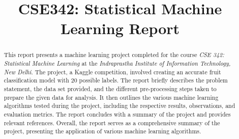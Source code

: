 \documentclass[conference]{IEEEtran}
\begin{document}
\title{CSE342: Statistical Machine Learning Report}

\makeatletter
\newcommand{\linebreakand}{%
  \end{@IEEEauthorhalign}
  \hfill\mbox{}\par
  \mbox{}\hfill\begin{@IEEEauthorhalign}
}
\makeatother


\author{
    \and
}

\maketitle

\begin{abstract}
    This report presents a machine learning project completed for the course \textit{CSE 342: Statistical Machine Learning} at the \textit{Indraprastha Institute of Information Technology, New Delhi}. The project, a Kaggle competition, involved creating an accurate fruit classification model with 20 possible labels. 
    The report briefly describes the problem statement, the data set provided, and the different pre-processing steps taken to prepare the given data for analysis. It then outlines the various machine learning algorithms tested during the project, including the respective results, observations, and evaluation metrics. 
    The report concludes with a summary of the project and provides relevant references. Overall, the report serves as a comprehensive summary of the project, presenting the application of various machine learning algorithms.
\end{abstract}
\end{document}
